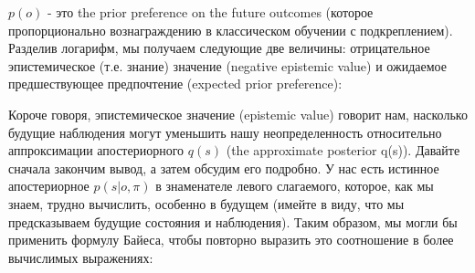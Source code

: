 \documentclass[12pt]{article}
\begin{document}
\begin{figure}[h]
\end{figure}

$p(o)$ - это the prior preference on the future outcomes (которое пропорционально вознаграждению в классическом обучении с подкреплением). Разделив логарифм, мы получаем следующие две величины:  отрицательное эпистемическое (т.е. знание) значение (negative epistemic value) и ожидаемое предшествующее предпочтение (expected prior preference):


\begin{figure}[h]
\end{figure}

Короче говоря, эпистемическое значение (epistemic value) говорит нам, насколько будущие наблюдения могут уменьшить нашу неопределенность относительно аппроксимации апостериорного $q(s)$ (the approximate posterior q(s)). Давайте сначала закончим вывод, а затем обсудим его подробно. У нас есть истинное апостериорное $p(s|o,\pi)$ в знаменателе левого слагаемого, которое, как мы знаем, трудно вычислить, особенно в будущем (имейте в виду, что мы предсказываем будущие состояния и наблюдения). Таким образом, мы могли бы применить формулу Байеса, чтобы повторно выразить это соотношение в более вычислимых выражениях:

\end{document}
